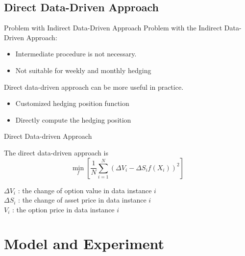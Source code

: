 \documentclass[10pt,table,mathserif]{beamer}
\begin{document}
\subsection{Direct Data-Driven Approach}
\begin{frame}{Problem with Indirect Data-Driven Approach}
Problem with the Indirect Data-Driven Approach:
\begin{itemize}
  \item Intermediate procedure is not necessary.
  \item Not suitable for weekly and monthly hedging
\end{itemize}

Direct data-driven approach can be more useful in practice.
\begin{itemize}
  \item Customized hedging position function
  \item Directly compute the hedging position
\end{itemize}
\end{frame}

\begin{frame}{Direct Data-driven Approach}

The direct data-driven approach is
\[
\min_{f}\left[\frac{1}{N} \sum_{i=1}^N (\Delta V_i-\Delta S_i f(X_i))^2 \right]
\]

\begin{center}
$\Delta V_i$ : the change of option value in data instance $i$\\
$\Delta S_i$ : the change of asset price in data instance $i$ \\
$V_i$ : the option price in data instance $i$ \\
\end{center}
\end{frame}



\section{Model and Experiment}
\end{document}
